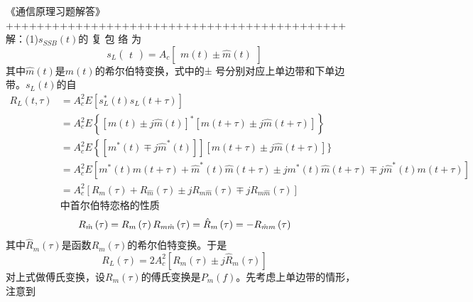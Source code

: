 \documentclass[utf8]{article}
\begin{document}
《通信原理习题解答》
++++++++++++++++++++++++++++++++++++++++++++\\
解：(1)$s_{SSB}\left ( t\right )$的 复 包 络 为 
	$$s_L\begin{pmatrix}t\end{pmatrix}=A_c\begin{bmatrix}m(t)\pm\hat{m}(t)\end{bmatrix}$$
	其中$\hat{m}(t)$是$m(t)$的希尔伯特变换，式中的± 号分别对应上单边带和下单边带。$s_L(t)$的自
	$$\begin{aligned}R_{L}\left(t,\tau\right)&=A_{c}^{2}E\left[s_{L}^{*}\left(t\right)s_{L}\left(t+\tau\right)\right]\\&=A_{c}^{2}E\left\{\left[m\left(t\right)\pm j\hat{m}\left(t\right)\right]^{*}\left[m\left(t+\tau\right)\pm j\hat{m}\left(t+\tau\right)\right]\right\}\\&=A_{c}^{2}E\left\{\left[m^{*}\left(t\right)\mp j\hat{m}^{*}\left(t\right)\right]\right]\left[m\left(t+\tau\right)\pm j\hat{m}\left(t+\tau\right)\right]\}\\&=A_{c}^{2}E\left[m^{*}\left(t\right)m\left(t+\tau\right)+\hat{m}^{*}\left(t\right)\hat{m}\left(t+\tau\right)\pm jm^{*}\left(t\right)\hat{m}\left(t+\tau\right)\mp j\hat{m}^{*}\left(t\right)m\left(t+\tau\right)\right]\\&=A_{c}^{2}\left[R_{m}\left(\tau\right)+R_{\hat{m}}\left(\tau\right)\pm jR_{m\hat{m}}\left(\tau\right)\mp jR_{m\hat{m}}\left(\tau\right)\right]\\&\text{中}\text{首尔伯特恋格的性质}\end{aligned}$$
	$$R_{\hat{m}}\left(\tau\right)=R_{m}\left(\tau\right)\\R_{m\hat{m}}\left(\tau\right)=\hat{R}_{m}\left(\tau\right)=-R_{\hat{m}m}\left(\tau\right)$$
	其中$\hat{R}_m\left(\tau\right)$是函数$R_m\left(\tau\right)$的希尔伯特变换。于是
	$$R_{L}\left(\tau\right)=2A_{c}^{2}\left[R_{m}\left(\tau\right)\pm j\hat{R}_{m}\left(\tau\right)\right]$$
	对上式做傅氏变换，设$R_m(\tau)$的傅氏变换是$P_m(f)$。先考虑上单边带的情形，注意到
	
\end{document}
